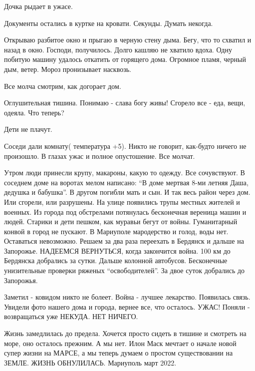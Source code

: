 Дочка рыдает в ужасе.

Документы остались в куртке на кровати. Секунды. Думать некогда.

Открываю разбитое окно и прыгаю в черную стену дыма. Бегу, что то схватил и
назад в окно. Господи, получилось. Долго кашляю не хватило вдоха. Одну побитую
машину удалось откатить от горящего дома. Огромное пламя, черный дым, ветер.
Мороз пронизывает насквозь.

Все молча смотрим, как догорает дом.

Оглушительная тишина. Понимаю - слава богу живы! Сгорело все - еда, вещи,
одеяла. Что теперь?

Дети не плачут. 

Соседи дали комнату( температура +5). Никто не говорит, как-будто ничего не
произошло. В глазах ужас и полное опустошение. Все молчат.

Утром люди принесли крупу, макароны, какую то одежду. Все сочувствуют. В
соседнем доме на воротах мелом написано: \enquote{В доме мертвая 8-ми летняя Даша,
дедушка и бабушка}. В другом погибли мать и сын. И так весь район через дом.
Или сгорели, или разрушены. На улице появились трупы местных жителей и военных.
Из города под обстрелами потянулась бесконечная вереница машин и людей. Старики
и дети пешком, как муравьи бегут от войны. Гуманитарный конвой в город не
пускают. В Мариуполе мародерство и голод, воды нет. Оставаться невозможно.
Решаем за два раза переехать в Бердянск и дальше на Запорожье. НАДЕЕМСЯ
ВЕРНУТЬСЯ, когда закончится война. 100 км до Бердянска добрались за сутки.
Дальше колонной автобусов. Бесконечные унизительные проверки ряженых
\enquote{освободителей}. За двое суток добрались до Запорожья. 

Заметил - ковидом никто не болеет. Война - лучшее лекарство. Появилась связь.
Увидели фото нашего дома и города, вернее все, что осталось. УЖАС! Поняли -
возвращаться уже НЕКУДА. НЕТ НИЧЕГО.

Жизнь замедлилась до предела. Хочется просто сидеть в тишине и смотреть на
море, оно осталось прежним. А мы нет. Илон Маск мечтает о начале новой супер
жизни на МАРСЕ, а мы теперь думаем о простом существовании на ЗЕМЛЕ. ЖИЗНЬ
ОБНУЛИЛАСЬ. Мариуполь март 2022.
